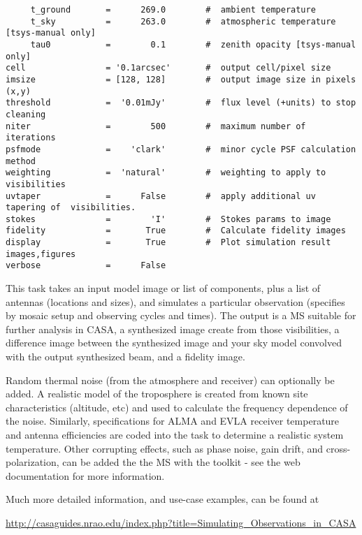 \begin{verbatim}
     t_ground       =      269.0        #  ambient temperature
     t_sky          =      263.0        #  atmospheric temperature [tsys-manual only]
     tau0           =        0.1        #  zenith opacity [tsys-manual only]
cell                = '0.1arcsec'       #  output cell/pixel size
imsize              = [128, 128]        #  output image size in pixels (x,y)
threshold           =  '0.01mJy'        #  flux level (+units) to stop cleaning
niter               =        500        #  maximum number of iterations
psfmode             =    'clark'        #  minor cycle PSF calculation method
weighting           =  'natural'        #  weighting to apply to visibilities
uvtaper             =      False        #  apply additional uv tapering of  visibilities.
stokes              =        'I'        #  Stokes params to image
fidelity            =       True        #  Calculate fidelity images
display             =       True        #  Plot simulation result images,figures
verbose             =      False        
\end{verbatim}
\normalsize

This task takes an input model image or list of components, plus a
list of antennas (locations and sizes), and simulates a particular
observation (specifies by mosaic setup and observing cycles and
times).  The output is a MS suitable for further analysis in CASA, a
synthesized image create from those visibilities, a difference image
between the synthesized image and your sky model convolved with the
output synthesized beam, and a fidelity image.

Random thermal noise (from the atmosphere and receiver) can optionally
be added. A realistic model of the troposphere is created from known
site characteristics (altitude, etc) and used to calculate the
frequency dependence of the noise.  Similarly, specifications for ALMA
and EVLA receiver temperature and antenna efficiencies are coded into
the task to determine a realistic system temperature.  Other
corrupting effects, such as phase noise, gain drift, and
cross-polarization, can be added the the MS with the toolkit - see the
web documentation for more information.

Much more detailed information, and use-case examples, can be found at 

\url{http://casaguides.nrao.edu/index.php?title=Simulating_Observations_in_CASA}

